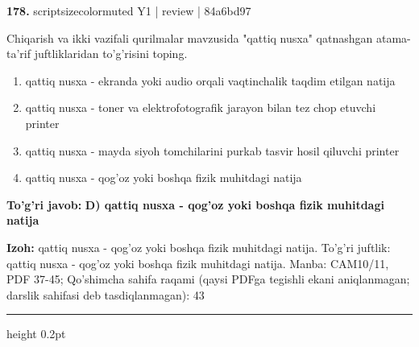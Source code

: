 \documentclass[10pt,a4paper]{article}
\begin{document}
{\bfseries\sffamily\color{ink} 178.} {scriptsizecolor{muted} Y1 | review | 84a6bd97}
\par
Chiqarish va ikki vazifali qurilmalar mavzusida "qattiq nusxa" qatnashgan atama-ta'rif juftliklaridan to'g'risini toping.
\begin{enumerate}[label=\Alph*),leftmargin=9mm]
\item qattiq nusxa - ekranda yoki audio orqali vaqtinchalik taqdim etilgan natija
\item qattiq nusxa - toner va elektrofotografik jarayon bilan tez chop etuvchi printer
\item qattiq nusxa - mayda siyoh tomchilarini purkab tasvir hosil qiluvchi printer
\item qattiq nusxa - qog'oz yoki boshqa fizik muhitdagi natija
\end{enumerate}
\begin{tcolorbox}[enhanced,breakable,colback=teal!4,colframe=teal!60!black,boxrule=0.45pt,arc=1.2mm,left=2.7mm,right=2.7mm,top=1.8mm,bottom=1.8mm,before skip=2mm,after skip=2mm]
{\bfseries\sffamily\color{teal}To'g'ri javob:} \textbf{D) qattiq nusxa - qog'oz yoki boshqa fizik muhitdagi natija}
\par\smallskip
{\bfseries Izoh:} qattiq nusxa - qog'oz yoki boshqa fizik muhitdagi natija. To'g'ri juftlik: qattiq nusxa - qog'oz yoki boshqa fizik muhitdagi natija. Manba: CAM10/11, PDF 37-45; Qo'shimcha sahifa raqami (qaysi PDFga tegishli ekani aniqlanmagan; darslik sahifasi deb tasdiqlanmagan): 43
\end{tcolorbox}
\vspace{2mm}\hrule height 0.2pt\vspace{3mm}
\end{document}
